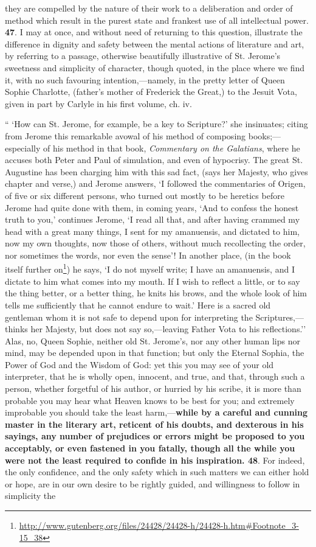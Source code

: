 \begin{quotationx}
they are compelled by the nature of their work to a deliberation and order of method which result in the purest state and frankest use of all intellectual power. \textbf{47}. I may at once, and without need of returning to this question, illustrate the difference in dignity and safety between the mental actions of literature and art, by referring to a passage, otherwise beautifully illustrative of St. Jerome's sweetness and simplicity of character, though quoted, in the place where we find it, with no such favouring intention,---namely, in the pretty letter of Queen Sophie Charlotte, (father's mother of Frederick the Great,) to the Jesuit Vota, given in part by Carlyle in his first volume, ch. iv.

`` `How can St. Jerome, for example, be a key to Scripture?' she insinuates; citing from Jerome this remarkable avowal of his method of composing books;---especially of his method in that book, \emph{Commentary on the Galatians}, where he accuses both Peter and Paul of simulation, and even of hypocrisy. The great St. Augustine has been charging him with this sad fact, (says her Majesty, who gives chapter and verse,) and Jerome answers, `I followed the commentaries of Origen, of five or six different persons, who turned out mostly to be heretics before Jerome had quite done with them, in coming years, `And to confess the honest truth to you,' continues Jerome, `I read all that, and after having crammed my head with a great many things, I sent for my amanuensis, and dictated to him, now my own thoughts, now those of others, without much recollecting the order, nor sometimes the words, nor even the sense'! In another place, (in the book itself further on\footnote{\url{http://www.gutenberg.org/files/24428/24428-h/24428-h.htm\#Footnote\_3-15\_38}}) he says, `I do not myself write; I have an amanuensis, and I dictate to him what comes into my mouth. If I wish to reflect a little, or to say the thing better, or a better thing, he knits his brows, and the whole look of him tells me sufficiently that he cannot endure to wait.' Here is a sacred old gentleman whom it is not safe to depend upon for interpreting the Scriptures,---thinks her Majesty, but does not say so,---leaving Father Vota to his reflections.'' Alas, no, Queen Sophie, neither old St. Jerome's, nor any other human lips nor mind, may be depended upon in that function; but only the Eternal Sophia, the Power of God and the Wisdom of God: yet this you may see of your old interpreter, that he is wholly open, innocent, and true, and that, through such a person, whether forgetful of his author, or hurried by his scribe, it is more than probable you may hear what Heaven knows to be best for you; and extremely improbable you should take the least harm,---\textbf{while by a careful and cunning master in the literary art, reticent of his doubts, and dexterous in his sayings, any number of prejudices or errors might be proposed to you acceptably, or even fastened in you fatally, though all the while you were not the least required to confide in his inspiration. 48}. For indeed, the only confidence, and the only safety which in such matters we can either hold or hope, are in our own desire to be rightly guided, and willingness to follow in simplicity the 
\end{quotationx}
